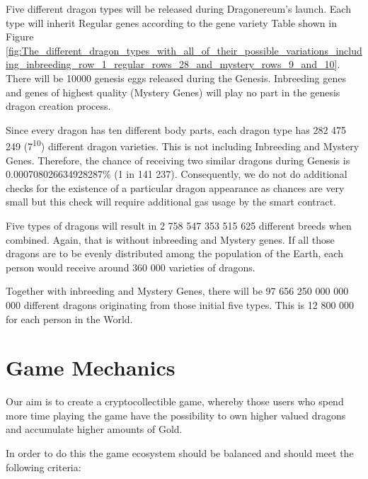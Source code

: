\documentclass[12pt]{article}
\begin{document}
Five different dragon types will be released during Dragonereum’s launch. Each type will inherit Regular genes according to the gene variety Table shown in Figure  \ref{fig:The_different_dragon_types_with_all_of_their_possible_variations_including_inbreeding_row_1_regular_rows_28_and_mystery_rows_9_and_10}.  There will be 10000 genesis eggs released during the Genesis. Inbreeding genes and genes of highest quality (Mystery Genes) will play no part in the genesis dragon creation process.\par

Since every dragon has ten different body parts, each dragon type has 282 475 249 (7\textsuperscript{10}) different dragon varieties. This is not including Inbreeding and Mystery Genes. Therefore, the chance of receiving two similar dragons during Genesis is 0.000708026634928287$\%$  (1 in 141 237). Consequently, we do not do additional checks for the existence of a particular dragon appearance as chances are very small but this check will require additional gas usage by the smart contract.\par

Five types of dragons will result in 2 758 547 353 515 625 different breeds when combined. Again, that is without inbreeding and Mystery genes. If all those dragons are to be evenly distributed among the population of the Earth, each person would receive around 360 000 varieties of dragons.\par

Together with inbreeding and Mystery Genes, there will be 97 656 250 000 000 000 different dragons originating from those initial five types. This is 12 800 000 for each person in the World.


\newpage
\par

\section{Game Mechanics}
 \label{Game Mechanics}  \par
 
Our aim is to create a cryptocollectible game, whereby those users who spend more time playing the game have the possibility to own higher valued dragons and accumulate higher amounts of Gold.\par

In order to do this the game ecosystem should be balanced and should meet the following criteria:\par
\end{document}
